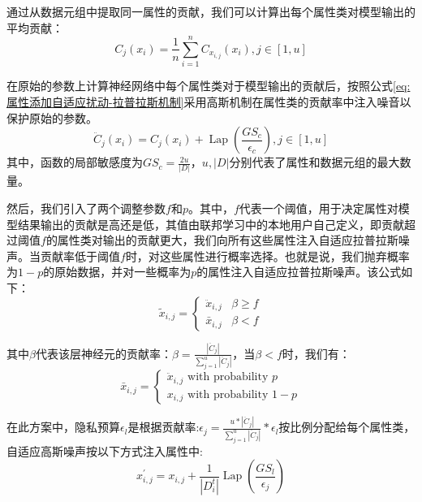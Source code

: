 通过从数据元组中提取同一属性的贡献，我们可以计算出每个属性类对模型输出的平均贡献：
\begin{equation}\label{eq:属性添加自适应扰动}
C_{j}\left(x_{i}\right)=\frac{1}{n} \sum_{i=1}^{n} C_{x_{i, j}}\left(x_{i}\right), j \in[1, u]
\end{equation}

在原始的参数上计算神经网络中每个属性类对于模型输出的贡献后，按照公式\ref{eq:属性添加自适应扰动-拉普拉斯机制}采用高斯机制在属性类的贡献率中注入噪音以保护原始的参数。
\begin{equation}\label{eq:属性添加自适应扰动-拉普拉斯机制}
\ddot{C}_{j}\left(x_{i}\right)=C_{j}\left(x_{i}\right)+\operatorname{Lap}\left(\frac{G S_{c}}{\epsilon_{c}}\right), j \in[1, u]
\end{equation}
其中，函数的局部敏感度为$G S_{c}=\frac{2 u}{|D|}$，$u,|D|$分别代表了属性和数据元组的最大数量。

然后，我们引入了两个调整参数$f$和$p$。其中，$f$代表一个阈值，用于决定属性对模型结果输出的贡献是高还是低，其值由联邦学习中的本地用户自己定义，即贡献超过阈值$f$的属性类对输出的贡献更大，我们向所有这些属性注入自适应拉普拉斯噪声。当贡献率低于阈值$f$时，对这些属性进行概率选择。也就是说，我们抛弃概率为$1-p$的原始数据，并对一些概率为$p$的属性注入自适应拉普拉斯噪声。该公式如下：
\begin{equation}\label{eq:神经网络加噪}
\tilde{x}_{i, j}=\left\{\begin{array}{ll}
\ddot{x}_{i, j} & \beta \geq f \\
\bar{x}_{i, j} & \beta<f
\end{array}\right.
\end{equation}

其中$\beta$代表该层神经元的贡献率：$\beta=\frac{\left|\ddot{C}_{j}\right|}{\sum_{j=1}^{u}\left|\ddot{C}_{j}\right|}$，当$\beta<f$时，我们有：
\begin{equation}\label{eq:神经网络加噪2}
\bar{x}_{i, j}=\left\{\begin{array}{l}
\ddot{x}_{i, j} \text { with probability } p \\
x_{i, j} \text { with probability } 1-p
\end{array}\right.
\end{equation}

在此方案中，隐私预算$\epsilon_{l}$是根据贡献率:$\epsilon_{j}=\frac{u *\left|\ddot{C}_{j}\right|}{\sum_{j=1}^{u}\left|\ddot{C}_{j}\right|} * \epsilon_{l}$按比例分配给每个属性类，自适应高斯噪声按以下方式注入属性中:
\begin{equation}\label{eq:神经网络加噪3}
x_{i, j}^{\prime}=x_{i, j}+\frac{1}{\left|D_{i}^{t}\right|} \operatorname{Lap}\left(\frac{G S_{l}}{\epsilon_{j}}\right)
\end{equation}

